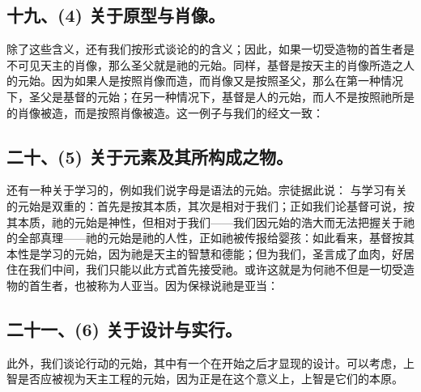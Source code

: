 
\subsection{十九、(4) 关于原型与肖像。}

除了这些含义，还有我们按形式谈论的的含义；因此，如果一切受造物的首生者是不可见天主的肖像，那么圣父就是祂的元始。同样，基督是按天主的肖像所造之人的元始。因为如果人是按照肖像而造，而肖像又是按照圣父，那么在第一种情况下，圣父是基督的元始；在另一种情况下，基督是人的元始，而人不是按照祂所是的肖像被造，而是按照肖像被造。这一例子与我们的经文一致：\par


\subsection{二十、(5) 关于元素及其所构成之物。}

还有一种关于学习的，例如我们说字母是语法的元始。宗徒据此说： 与学习有关的元始是双重的：首先是按其本质，其次是相对于我们；正如我们论基督可说，按其本质，祂的元始是神性，但相对于我们——我们因元始的浩大而无法把握关于祂的全部真理——祂的元始是祂的人性，正如祂被传报给婴孩：如此看来，基督按其本性是学习的元始，因为祂是天主的智慧和德能；但为我们，圣言成了血肉，好居住在我们中间，我们只能以此方式首先接受祂。或许这就是为何祂不但是一切受造物的首生者，也被称为人亚当。因为保禄说祂是亚当： \par


\subsection{二十一、(6) 关于设计与实行。}

此外，我们谈论行动的元始，其中有一个在开始之后才显现的设计。可以考虑，上智是否应被视为天主工程的元始，因为正是在这个意义上，上智是它们的本原。\par

